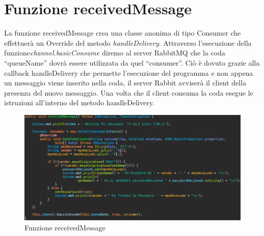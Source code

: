 \documentclass[a4paper,12pt,titlepage,oneside,openany]{book}
\begin{document}
\section{Funzione receivedMessage}
La funzione receivedMessage crea una classe anonima di tipo Consumer che effettuerà un Override del metodo \textit{handleDelivery}. Attraverso l'esecuzione della funzione\textit{channel.basicConsume} diremo al server RabbitMQ che la coda “queueName” dovrà essere utilizzata da quel “consumer”. Ciò è dovuto grazie alla callback handleDelivery che permette l'esecuzione del programma e non appena un messaggio viene inserito nella coda, il server Rabbit avviserà il client della presenza del nuovo messaggio. Una volta che il client consuma la coda esegue le istruzioni all'interno del metodo handleDelivery.
\begin{figure}[H]
	\centering
	\includegraphics[scale=0.4]{receivedMessage.png}
	\caption{Funzione receivedMessage}
	\label{fig:receivedMessage}
\end{figure}
\end{document}
